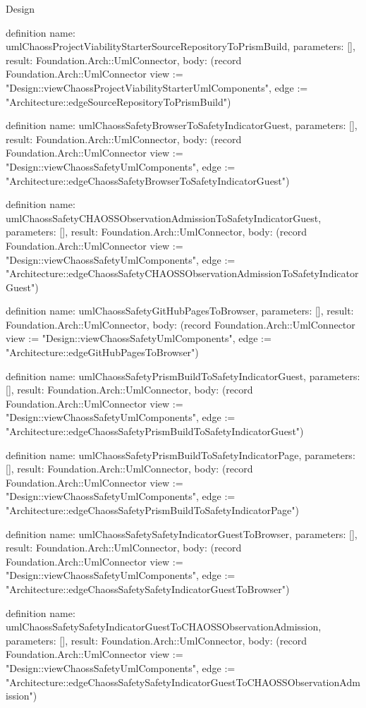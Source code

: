\begin{lexlean}{Design}
\begin{semanticmodule}
definition{
  name: umlChaossProjectViabilityStarterSourceRepositoryToPrismBuild,
  parameters: [],
  result: Foundation.Arch::UmlConnector,
  body: (record Foundation.Arch::UmlConnector {view := "Design::viewChaossProjectViabilityStarterUmlComponents", edge := "Architecture::edgeSourceRepositoryToPrismBuild"})
}

definition{
  name: umlChaossSafetyBrowserToSafetyIndicatorGuest,
  parameters: [],
  result: Foundation.Arch::UmlConnector,
  body: (record Foundation.Arch::UmlConnector {view := "Design::viewChaossSafetyUmlComponents", edge := "Architecture::edgeChaossSafetyBrowserToSafetyIndicatorGuest"})
}

definition{
  name: umlChaossSafetyCHAOSSObservationAdmissionToSafetyIndicatorGuest,
  parameters: [],
  result: Foundation.Arch::UmlConnector,
  body: (record Foundation.Arch::UmlConnector {view := "Design::viewChaossSafetyUmlComponents", edge := "Architecture::edgeChaossSafetyCHAOSSObservationAdmissionToSafetyIndicatorGuest"})
}

definition{
  name: umlChaossSafetyGitHubPagesToBrowser,
  parameters: [],
  result: Foundation.Arch::UmlConnector,
  body: (record Foundation.Arch::UmlConnector {view := "Design::viewChaossSafetyUmlComponents", edge := "Architecture::edgeGitHubPagesToBrowser"})
}

definition{
  name: umlChaossSafetyPrismBuildToSafetyIndicatorGuest,
  parameters: [],
  result: Foundation.Arch::UmlConnector,
  body: (record Foundation.Arch::UmlConnector {view := "Design::viewChaossSafetyUmlComponents", edge := "Architecture::edgeChaossSafetyPrismBuildToSafetyIndicatorGuest"})
}

definition{
  name: umlChaossSafetyPrismBuildToSafetyIndicatorPage,
  parameters: [],
  result: Foundation.Arch::UmlConnector,
  body: (record Foundation.Arch::UmlConnector {view := "Design::viewChaossSafetyUmlComponents", edge := "Architecture::edgeChaossSafetyPrismBuildToSafetyIndicatorPage"})
}

definition{
  name: umlChaossSafetySafetyIndicatorGuestToBrowser,
  parameters: [],
  result: Foundation.Arch::UmlConnector,
  body: (record Foundation.Arch::UmlConnector {view := "Design::viewChaossSafetyUmlComponents", edge := "Architecture::edgeChaossSafetySafetyIndicatorGuestToBrowser"})
}

definition{
  name: umlChaossSafetySafetyIndicatorGuestToCHAOSSObservationAdmission,
  parameters: [],
  result: Foundation.Arch::UmlConnector,
  body: (record Foundation.Arch::UmlConnector {view := "Design::viewChaossSafetyUmlComponents", edge := "Architecture::edgeChaossSafetySafetyIndicatorGuestToCHAOSSObservationAdmission"})
}


\end{semanticmodule}
\end{lexlean}
